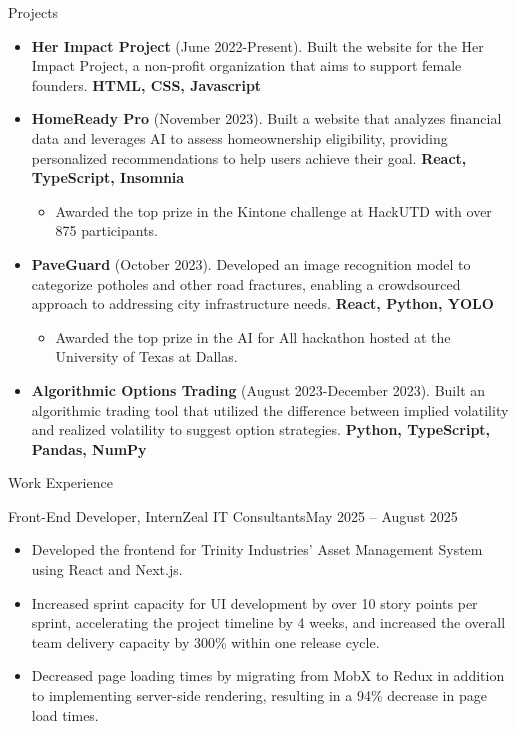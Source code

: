\documentclass[]{mcdowellcv}
\begin{document}
	\begin{cvsection}{Projects}
		\begin{cvsubsection}{}{}{}	
			\begin{itemize}
				\item \textbf{Her Impact Project} (June 2022-Present).  Built the website for the Her Impact Project, a non-profit organization that aims to support female founders. \textbf{HTML, CSS, Javascript}
				\item \textbf{HomeReady Pro} (November 2023). Built a website that analyzes financial data and leverages AI to assess homeownership eligibility, providing personalized recommendations to help users achieve their goal. \textbf{React, TypeScript, Insomnia}
				\begin{itemize}
				\item Awarded the top prize in the Kintone challenge at HackUTD with over 875 participants.
				\end{itemize}
				\item \textbf{PaveGuard} (October 2023). Developed an image recognition model to categorize potholes and other road fractures, enabling a crowdsourced approach to addressing city infrastructure needs. \textbf{React, Python, YOLO}
				\begin{itemize}
					\item Awarded the top prize in the AI for All hackathon hosted at the University of Texas at Dallas.
				\end{itemize}
				\item \textbf{Algorithmic Options Trading} (August 2023-December 2023). Built an algorithmic trading tool that utilized the difference between implied volatility and realized volatility to suggest option strategies. \textbf{Python, TypeScript, Pandas, NumPy}
			\end{itemize}
		\end{cvsubsection}
	\end{cvsection}
		\begin{cvsection}{Work Experience}
		\begin{cvsubsection}{Front-End Developer, Intern}{Zeal IT Consultants}{May 2025 -- August 2025}			
			\begin{itemize}
				\item Developed the frontend for Trinity Industries' Asset Management System using React and Next.js.
				\item Increased sprint capacity for UI development by over 10 story points per sprint, accelerating the project timeline by 4 weeks, and increased the overall team delivery capacity by 300\% within one release cycle.
				\item Decreased page loading times by migrating from MobX to Redux in addition to implementing server-side rendering, resulting in a 94\% decrease in page load times.
			\end{itemize}
		\end{cvsubsection}
	\end{cvsection}
\end{document}
